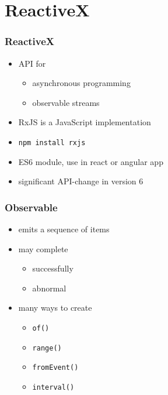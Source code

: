 \section{ReactiveX}
\begin{frame}[fragile]\frametitle{ReactiveX}
\begin{itemize}\color{structure}
  \item API for
  \begin{itemize}
    \item asynchronous programming
    \item observable streams
  \end{itemize}
  \item RxJS is a JavaScript implementation
  \item \texttt{npm install rxjs}
  \item ES6 module, use in react or angular app
  \item significant API-change in version 6
\end{itemize}
\end{frame}

\begin{frame}[fragile]\frametitle{Observable}
\begin{itemize}\color{structure}
  \item emits a sequence of items
  \item may complete
  \begin{itemize}
    \item successfully
    \item abnormal
  \end{itemize}
  \item many ways to create
  \begin{itemize}
    \item \texttt{of()}
    \item \texttt{range()}
    \item \texttt{fromEvent()}
    \item \texttt{interval()}
  \end{itemize}
\end{itemize}
\end{frame}

